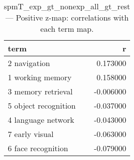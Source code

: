 \begin{table}
\caption{spmT_exp_gt_nonexp_all_gt_rest — Positive z-map: correlations with each term map.}
\label{tab:spmT_exp_gt_nonexp_all_gt_rest_pos}
\begin{tabular}{lr}
\toprule
term & r \\
\midrule
2 navigation & 0.173000 \\
1 working memory & 0.158000 \\
3 memory retrieval & -0.006000 \\
5 object recognition & -0.037000 \\
4 language network & -0.043000 \\
7 early visual & -0.063000 \\
6 face recognition & -0.079000 \\
\bottomrule
\end{tabular}
\end{table}
